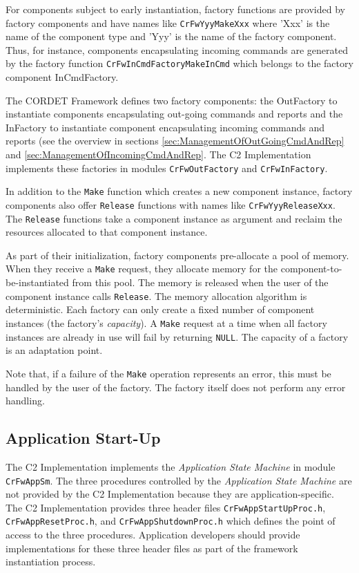 \documentclass{pnp_article}
\begin{document}
For components subject to early instantiation, factory functions are provided by factory components and have names like \texttt{CrFwYyyMakeXxx} where 'Xxx' is the name of the component type and 'Yyy' is the name of the factory component. Thus, for instance, components encapsulating incoming commands are generated by the factory function \texttt{CrFwInCmdFactoryMakeInCmd} which belongs to the factory component InCmdFactory.  

The CORDET Framework defines two factory components: the OutFactory to instantiate components encapsulating out-going commands and reports and the InFactory to instantiate component encapsulating incoming commands and reports (see the overview in sections \ref{sec:ManagementOfOutGoingCmdAndRep} and \ref{sec:ManagementOfIncomingCmdAndRep}. The C2 Implementation implements these factories in modules \texttt{CrFwOutFactory} and \texttt{CrFwInFactory}. 

In addition to the \texttt{Make} function which creates a new component instance, factory components also offer \texttt{Release} functions with names like \texttt{CrFwYyyReleaseXxx}. The \texttt{Release} functions take a component instance as argument and reclaim the resources allocated to that component instance.

As part of their initialization, factory components pre-allocate a pool of memory. When they receive a \texttt{Make} request, they allocate memory for the component-to-be-instantiated from this pool. The memory is released when the user of the component instance calls \texttt{Release}. The memory allocation algorithm is deterministic. Each factory can only create a fixed number of component instances (the factory's \textit{capacity}). A \texttt{Make} request at a time when all factory instances are already in use will fail by returning \texttt{NULL}. The capacity of a factory is an adaptation point.

Note that, if a failure of the \texttt{Make} operation represents an error, this must be handled by the user of the factory. The factory itself does not perform any error handling.

\subsection{Application Start-Up}\label{sec:AppStartUp}


The C2 Implementation implements the \textit{Application State Machine} in module \texttt{CrFwAppSm}. The three procedures controlled by the \textit{Application State Machine} are not provided by the C2 Implementation because they are application-specific. The C2 Implementation provides three header files \texttt{CrFwAppStartUpProc.h}, \texttt{CrFwAppResetProc.h}, and \texttt{CrFwAppShutdownProc.h} which defines the point of access to the three procedures. Application developers should provide implementations for these three header files as part of the framework instantiation process.
\end{document}
